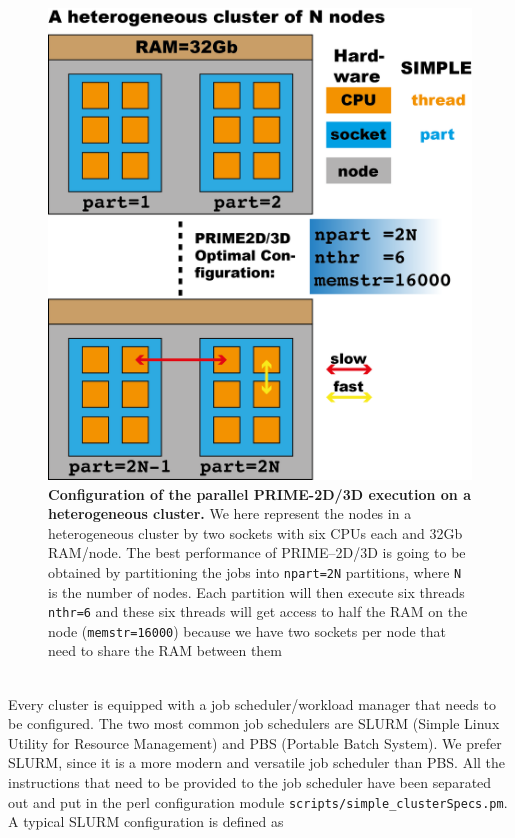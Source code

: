 \documentclass[a4paper,11pt]{article}
\begin{document}
\begin{figure}
\includegraphics[keepaspectratio=true,scale=0.6]{./CPU_topo/cputopo}
\caption{\textbf{Configuration of the parallel PRIME-2D/3D execution on a heterogeneous cluster.} We here represent the nodes in  a heterogeneous cluster by two sockets with six CPUs each and 32Gb RAM/node. The best performance of PRIME--2D/3D is going to be obtained by partitioning  the jobs into \texttt{npart=2N} partitions, where \texttt{N} is the number of nodes. Each partition will then execute six threads \texttt{nthr=6} and these six threads will get access to half the RAM on the node (\texttt{memstr=16000}) because we have two sockets per node that need to share the RAM between them}
\end{figure}
\\Every cluster is equipped with a job scheduler/workload manager that needs to be configured. The two most common job schedulers are SLURM (Simple Linux Utility for Resource Management) and PBS (Portable Batch System). We prefer SLURM, since it is a more modern and versatile job scheduler than PBS. All the instructions that need to be provided to the job scheduler have been separated out and put in the perl configuration module \texttt{scripts/simple\_clusterSpecs.pm}. A typical SLURM configuration is defined as
\end{document}
